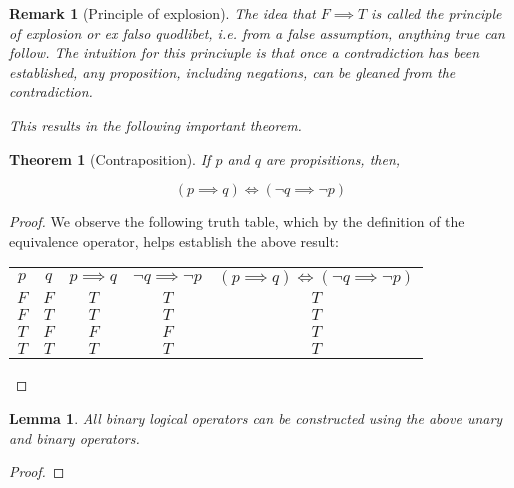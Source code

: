\documentclass[12pt]{article}
\newtheorem{theorem}{Theorem}[section]
\newtheorem{lemma}{Lemma}[section]
\newtheorem{remark}{Remark}[section]
\begin{document}
\begin{shaded}
\begin{remark}[Principle of explosion]
The idea that $F \implies T$ is called the \emph{principle of explosion} or \emph{ex falso quodlibet}, i.e. from a false assumption, anything true can follow. The intuition for this princiuple is that once a contradiction has been established, any proposition, including negations, can be gleaned from the contradiction.

This results in the following important theorem.
\end{remark}

\begin{theorem}[Contraposition] If $p$ and $q$ are propisitions, then,

$$\left( p \implies q \right) \Longleftrightarrow \left( \lnot q \implies \lnot p \right)$$
\end{theorem}

\begin{proof}
We observe the following truth table, which by the definition of the equivalence operator, helps establish the above result:

\begin{center}
\begin{tabular}{|c|c||c|c||c|}
\hline
$p$ & $q$ & $p \implies q$ & $\lnot q \implies \lnot p$ & $\left( p \implies q \right) \Longleftrightarrow \left( \lnot q \implies \lnot p \right)$ \\
\hhline{|=|=||=|=||=|}
$F$ & $F$ & $T$ & $T$ & $T$ \\
\hline
$F$ & $T$ & $T$ & $T$ & $T$ \\
\hline
$T$ & $F$ & $F$ & $F$ & $T$ \\
\hline
$T$ & $T$ & $T$ & $T$ & $T$ \\
\hline
\end{tabular}
\end{center}
\end{proof}
\end{shaded}

\begin{lemma}
All binary logical operators can be constructed using the above unary and binary operators.
\end{lemma}

\begin{proof}

\end{proof}
\end{document}
